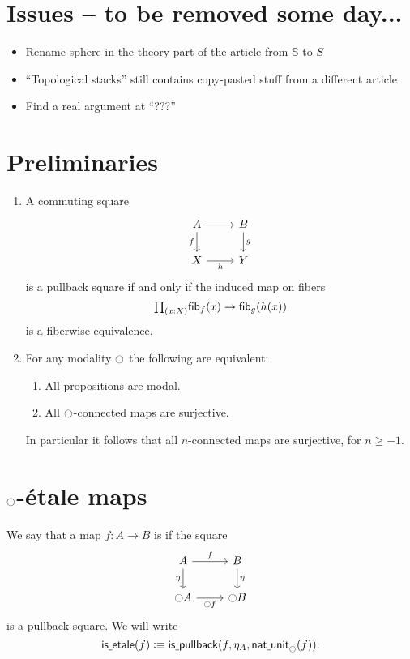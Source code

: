 \documentclass[9pt,twosided]{amsart}
\newcommand{\bS}{\mathbb S}
\begin{document}
\section{Issues -- to be removed some day...}
\begin{itemize}
\item Rename sphere in the theory part of the article from $\bS$ to $S$
\item ``Topological stacks'' still contains copy-pasted stuff from a different article
\item Find a real argument at ``???''
\end{itemize}

\section{Preliminaries}
\begin{enumerate}
\item A commuting square
\begin{equation*}
\begin{tikzcd}
A \arrow[d,swap,"f"] \arrow[r] & B \arrow[d,"g"] \\
X \arrow[r,swap,"h"] & Y
\end{tikzcd}
\end{equation*}
is a pullback square if and only if the induced map on fibers
\begin{equation*}
\prd{x:X}\fib{f}{x}\to\fib{g}{h(x)}
\end{equation*}
is a fiberwise equivalence.
\item For any modality ${\ocircle}$ the following are equivalent:
\begin{enumerate}
\item All propositions are modal.
\item All ${\ocircle}$-connected maps are surjective.
\end{enumerate}
In particular it follows that all $n$-connected maps are surjective, for $n\geq -1$.
\end{enumerate}

\section{\texorpdfstring{${\ocircle}$}{○}-\'etale maps}

\begin{defn}
We say that a map $f:A\to B$ is  if the square
\begin{equation*}
\begin{tikzcd}
A \arrow[r,"f"] \arrow[d,swap,"\eta"] & B \arrow[d,"\eta"] \\
\modal A \arrow[r,swap,"\modal f"] & \modal B
\end{tikzcd}
\end{equation*}
is a pullback square. We will write
\begin{equation*}
\mathsf{is\underline{\ }{}etale}(f)\vcentcolon\equiv\mathsf{is\underline{\ }{}pullback}(f,\eta_A,\mathsf{nat\underline{\ }{}unit}_{\ocircle}(f)).
\end{equation*}
\end{defn}
\end{document}
